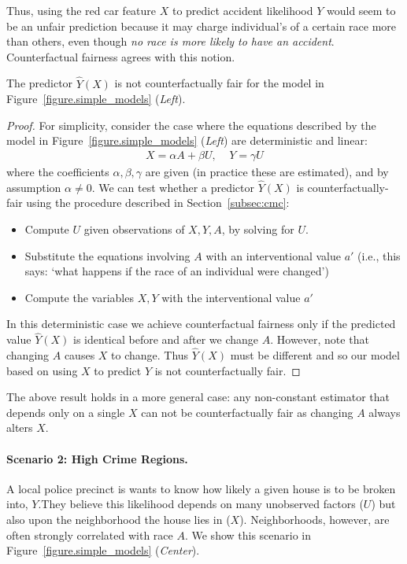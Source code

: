 Thus, using the red car feature $X$ to predict accident likelihood $Y$ would seem to be an unfair prediction because it may charge individual's of a certain race more than others, even though {\em no race is more likely to have an accident}. Counterfactual fairness agrees with this notion. 
%
\begin{lem}
The predictor $\hat{Y}(X)$ is not counterfactually fair for the model in Figure~\ref{figure.simple_models} (\emph{Left}).
\end{lem}
%
\begin{proof}
For simplicity, consider the case where the equations described by the model in Figure~\ref{figure.simple_models} (\emph{Left}) are deterministic and linear:
\begin{align}
X = \alpha A + \beta U, \;\;\;\; Y = \gamma U \nonumber
\end{align}
where the coefficients $\alpha,\beta,\gamma$ are given (in practice these are estimated), and by assumption $\alpha \neq 0$. We can test whether a predictor $\hat{Y}(X)$ is counterfactually-fair using the procedure described in Section~\ref{subsec:cmc}:
\begin{itemize}
\item Compute $U$ given observations of $X,Y,A$, by solving for $U$.
\item Substitute the equations involving $A$ with an interventional value $a'$ (i.e., this says: `what happens if the race of an individual were changed')
\item Compute the variables $X,Y$ with the interventional value $a'$
\end{itemize}
In this deterministic case we achieve counterfactual fairness only if the predicted value $\hat{Y}(X)$ is identical before and after we change $A$. However, note that changing $A$ causes $X$ to change. Thus $\hat{Y}(X)$ must be different and so our model based on using $X$ to predict $Y$ is not counterfactually fair.
\end{proof}
The above result holds in a more general case: any non-constant estimator that depends only on a single $X$ can not be counterfactually fair as changing $A$ always alters $X$.
%
%
\paragraph{Scenario 2: High Crime Regions.} 
A local police precinct is wants to know how likely a given house is to be broken into, $Y$.They believe this likelihood depends on many unobserved factors
($U$) but also upon the neighborhood the house lies in ($X$). Neighborhoods, however, are often strongly correlated with
race $A$. We show this scenario in Figure~\ref{figure.simple_models} (\emph{Center}).


